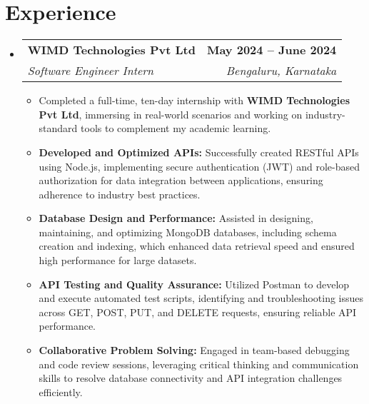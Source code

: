 \documentclass[a4paper,11pt]{article}
\makeatletter
\newcommand{\resumeItem}[1]{
  \item\small{#1 \vspace{-2pt}}
}
\newcommand{\resumeSubheading}[4]{
  \vspace{-2pt}\item
    \begin{tabular*}{0.97\textwidth}[t]{l@{\extracolsep{\fill}}r}
      \textbf{#1} & \textbf{\small #2} \\
      \textit{\small#3} & \textit{\small #4} \\
    \end{tabular*}\vspace{-7pt}
}
\newcommand{\resumeSubHeadingListStart}{\begin{itemize}[leftmargin=0.15in, label={}]}
\newcommand{\resumeSubHeadingListEnd}{\end{itemize}}
\newcommand{\resumeItemListStart}{\begin{itemize}}
\newcommand{\resumeItemListEnd}{\end{itemize}\vspace{-5pt}}
\makeatother
\begin{document}
\section{Experience}
\resumeSubHeadingListStart
  \resumeSubheading
    {WIMD Technologies Pvt Ltd}{May 2024 -- June 2024}
    {Software Engineer Intern}{Bengaluru, Karnataka}
    \resumeItemListStart
      \resumeItem{Completed a full-time, ten-day internship with \textbf{WIMD Technologies Pvt Ltd}, immersing in real-world scenarios and working on industry-standard tools to complement my academic learning.}
      \resumeItem{\textbf{Developed and Optimized APIs:} Successfully created RESTful APIs using Node.js, implementing secure authentication (JWT) and role-based authorization for data integration between applications, ensuring adherence to industry best practices.}
      \resumeItem{\textbf{Database Design and Performance:} Assisted in designing, maintaining, and optimizing MongoDB databases, including schema creation and indexing, which enhanced data retrieval speed and ensured high performance for large datasets.}
      \resumeItem{\textbf{API Testing and Quality Assurance:} Utilized Postman to develop and execute automated test scripts, identifying and troubleshooting issues across GET, POST, PUT, and DELETE requests, ensuring reliable API performance.}
      \resumeItem{\textbf{Collaborative Problem Solving:} Engaged in team-based debugging and code review sessions, leveraging critical thinking and communication skills to resolve database connectivity and API integration challenges efficiently.}
    \resumeItemListEnd
\resumeSubHeadingListEnd
\end{document}
